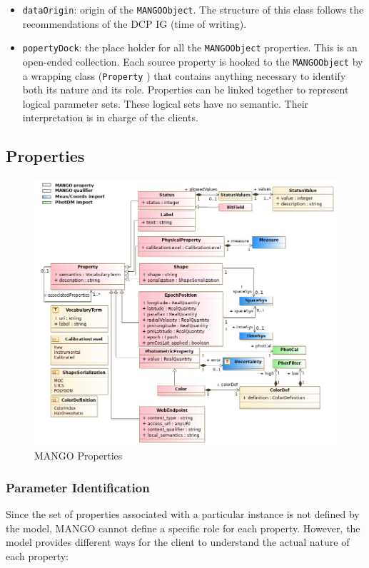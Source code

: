\documentclass[11pt,a4paper]{ivoa}
\begin{document}
\begin{itemize}
  \item \texttt{dataOrigin}: origin of the \texttt{MANGOObject}. The structure of this class follows
        the recommendations of the DCP IG (time of writing).
  \item \texttt{popertyDock}: the place holder for all the \texttt{MANGOObject} properties.
        This is an open-ended collection.
        Each source property is hooked to the \texttt{MANGOObject} by a wrapping class (\texttt{Property} )
        that contains anything necessary to identify both its nature and its role.
        Properties can be linked together to represent logical parameter sets. 
        These logical sets have no semantic. Their interpretation is in charge of the clients.
\end{itemize}
\subsection{Properties}

      \begin{figure}[h]
        \includegraphics[width=1.0\textwidth]{../model/property.png}
        \caption{MANGO Properties}
        \label{fig:property}
      \end{figure}

\subsubsection{Parameter Identification}
Since the set of properties associated with a particular instance is not defined by the model,
MANGO cannot define a specific role for each property. However, the model provides different ways
for the client to understand the actual nature of each property:
\end{document}
